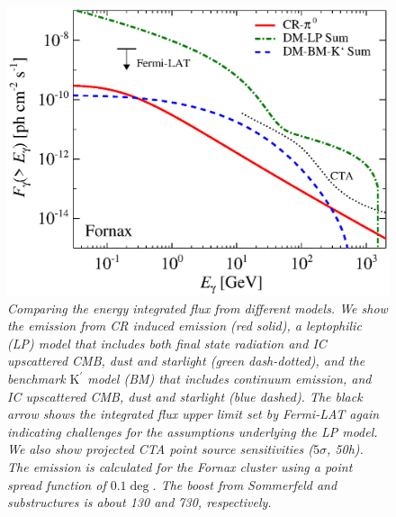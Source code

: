 \documentclass[10pt,aps,pra,reprint,amsmath,amsfonts,amssymb,showpacs,nofootinbib,floatfix]{revtex4-1}
\newcommand{\rmn}{\mathrm}
\newcommand{\Kp}{\rmn{K}^\prime}
\begin{document}
\begin{figure}
 \includegraphics[width=0.99\columnwidth]{figures/flux.int.v12.0.1deg.1.6T.SubMass.SF300.IR2.noMW.woGal.eps}
 \caption{\it Comparing the energy integrated flux from different
   models. We show the emission from CR induced emission (red solid),
   a leptophilic (LP) model that includes both final state radiation
   and IC upscattered CMB, dust and starlight (green dash-dotted), and
   the benchmark $\Kp$ model (BM) that includes continuum emission, and
   IC upscattered CMB, dust and starlight (blue dashed). The black
   arrow shows the integrated flux upper limit set by Fermi-LAT again
   indicating challenges for the assumptions underlying the LP
   model. We also show projected CTA point source sensitivities
   ($5\sigma$, 50h). The emission is calculated for the Fornax cluster
   using a point spread function of $0.1\deg$. The boost from
   Sommerfeld and substructures is about 130 and 730, respectively.}
 \label{fig:flux_int}
\end{figure}
\end{document}
